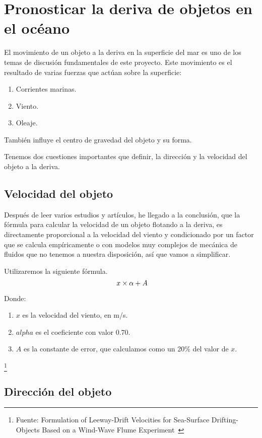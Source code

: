 \section{Pronosticar la deriva de objetos en el océano}

El movimiento de un objeto a la deriva en la superficie del mar es uno 
de los temas de discusión fundamentales de este proyecto. Este
 movimiento es el resultado de varias fuerzas que actúan sobre la superficie:

\begin{enumerate}
\item Corrientes marinas.
\item Viento.
\item Oleaje.
\end{enumerate}


También influye el centro de gravedad del objeto y su forma.

Tenemos dos cuestiones importantes que definir, la dirección 
y la velocidad del objeto a la deriva.

\subsection{Velocidad del objeto}

Después de leer varios estudios y artículos, he llegado a la
 conclusión, que la fórmula para calcular la velocidad de un objeto 
flotando a la deriva, es directamente proporcional a la velocidad
del viento y condicionado por un factor que se calcula empíricamente
 o con modelos muy complejos de mecánica de fluidos que no 
tenemos a nuestra disposición, así que vamos a simplificar.

Utilizaremos la siguiente fórmula.
\[\
   x \times \alpha + A \\  
\]

Donde:
\begin{enumerate}
\item $x$ es la velocidad del viento, en m/s.
\item $alpha$ es el coeficiente con valor 0.70.
\item $A$ es la constante de error, que calculamos como un 20\% del valor de $x$.
\end{enumerate}

\footnote{Fuente: Formulation of Leeway-Drift Velocities for Sea-Surface
Drifting-Objects Based on a Wind-Wave Flume Experiment~\cite{VDERIVA}}



\subsection{Dirección del objeto}


